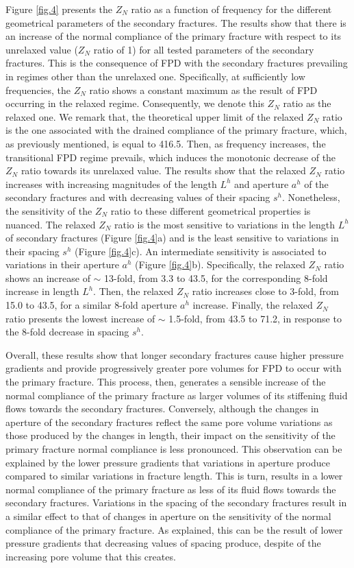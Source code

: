 \documentclass[draft]{agujournal2019}
\begin{document}
Figure \ref{fig.4} presents the $Z_N$ ratio as a function of frequency for the different geometrical parameters of the secondary fractures. The results show that there is an increase of the normal compliance of the primary fracture with respect to its unrelaxed value ($Z_N$ ratio of 1) for all tested parameters of the secondary fractures. This is the consequence of FPD with the secondary fractures prevailing in regimes other than the unrelaxed one. Specifically, at sufficiently low frequencies, the
$Z_N$ ratio shows a constant maximum as the result of FPD occurring in the relaxed regime. Consequently, we denote this $Z_N$ ratio as the relaxed one. We remark that, the theoretical upper limit of the relaxed $Z_N$ ratio is the one associated with the drained compliance of the primary fracture, which, as previously mentioned, is equal to 416.5. 
Then, as frequency increases, the transitional FPD regime prevails, which induces the monotonic decrease of the $Z_N$ ratio towards its unrelaxed value. The results show that the relaxed $Z_N$ ratio increases with increasing magnitudes of the length $L^h$ and aperture $a^h$ of the secondary fractures and with decreasing  values of their spacing $s^h$.
Nonetheless, the sensitivity of the $Z_N$ ratio to these different geometrical properties is nuanced.
The relaxed $Z_N$ ratio is the most sensitive to variations in the length $L^h$ of secondary fractures (Figure \ref{fig.4}a) and is the least sensitive to variations in their spacing $s^h$ (Figure \ref{fig.4}c). An intermediate sensitivity is associated to variations in their aperture $a^h$ (Figure \ref{fig.4}b). Specifically, the relaxed $Z_N$ ratio shows an increase of $\sim$ 13-fold, from  3.3 to 43.5, for the corresponding 8-fold increase in length $L^h$. Then, the relaxed $Z_N$ ratio increases close to 3-fold, from 15.0 to 43.5, for a similar 8-fold aperture $a^h$ increase. Finally, the relaxed $Z_N$ ratio presents the lowest increase of $\sim$ 1.5-fold, from 43.5 to 71.2, in response to the 8-fold decrease in spacing $s^h$. 

Overall, these results show that longer secondary fractures cause  higher pressure gradients and provide progressively greater pore volumes for FPD to occur with the primary fracture. This process, then, generates a sensible increase of the normal compliance of the primary fracture as  larger volumes of its stiffening fluid flows towards the secondary fractures. Conversely, although the changes in aperture of the secondary fractures reflect the same pore volume variations as those produced by the changes in length, their impact on the sensitivity of the primary fracture normal compliance is less pronounced. This observation can be explained by the lower pressure gradients that variations in aperture produce compared to similar variations in fracture length. This is turn, results in a lower normal compliance of the primary fracture as less of its fluid flows towards the secondary fractures. Variations in the spacing of the secondary fractures  result in a similar effect to that of changes in aperture on the sensitivity of the normal compliance of the primary fracture.  As explained, this can be the result of lower pressure gradients that decreasing values of spacing produce, despite of the increasing pore volume that this creates.
\end{document}
